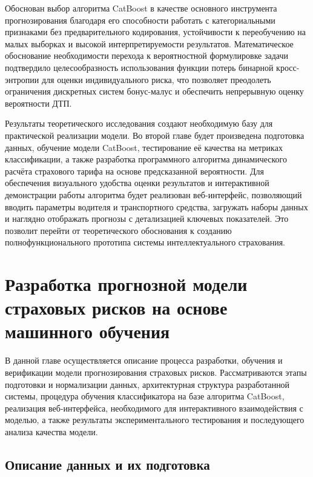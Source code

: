 Обоснован выбор алгоритма CatBoost в качестве основного инструмента прогнозирования благодаря его способности работать с категориальными признаками без предварительного кодирования, устойчивости к переобучению на малых выборках и высокой интерпретируемости результатов. Математическое обоснование необходимости перехода к вероятностной формулировке задачи подтвердило целесообразность использования функции потерь бинарной кросс-энтропии для оценки индивидуального риска, что позволяет преодолеть ограничения дискретных систем бонус-малус и обеспечить непрерывную оценку вероятности ДТП.

Результаты теоретического исследования создают необходимую базу для практической реализации модели. Во второй главе будет произведена подготовка данных, обучение модели CatBoost, тестирование её качества на метриках классификации, а также разработка программного алгоритма динамического расчёта страхового тарифа на основе предсказанной вероятности. Для обеспечения визуального удобства оценки результатов и интерактивной демонстрации работы алгоритма будет реализован веб-интерфейс, позволяющий вводить параметры водителя и транспортного средства, загружать наборы данных и наглядно отображать прогнозы с детализацией ключевых показателей. Это позволит перейти от теоретического обоснования к созданию полнофункционального прототипа системы интеллектуального страхования.

\pagebreak
\section{Разработка прогнозной модели страховых рисков на основе машинного обучения}

В данной главе осуществляется описание процесса разработки, обучения и верификации модели прогнозирования страховых рисков. Рассматриваются этапы подготовки и нормализации данных, архитектурная структура разработанной системы, процедура обучения классификатора на базе алгоритма CatBoost, реализация веб-интерфейса, необходимого для интерактивного взаимодействия с моделью, а также результаты экспериментального тестирования и последующего анализа качества модели.
\subsection{Описание данных и их подготовка}

